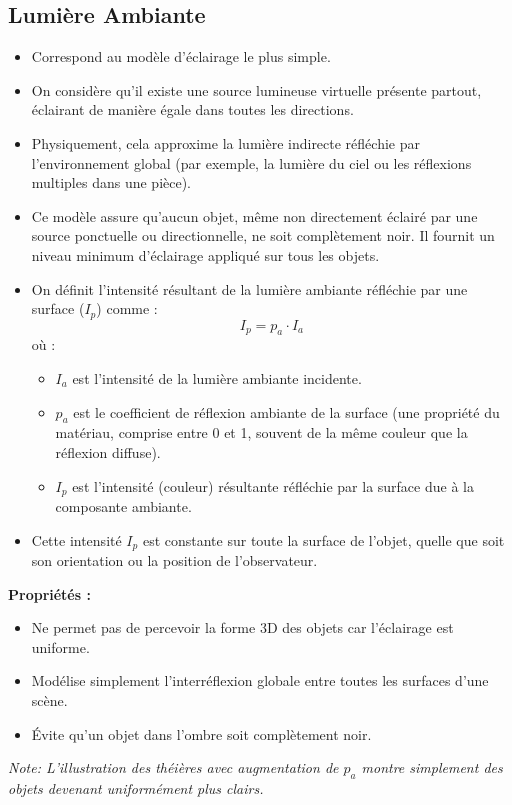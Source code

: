 \documentclass{article}
\begin{document}
\subsection{Lumière Ambiante}
\begin{itemize}
    \item Correspond au modèle d'éclairage le plus simple.
    \item On considère qu'il existe une source lumineuse virtuelle présente partout, éclairant de manière égale dans toutes les directions.
    \item Physiquement, cela approxime la lumière indirecte réfléchie par l'environnement global (par exemple, la lumière du ciel ou les réflexions multiples dans une pièce).
    \item Ce modèle assure qu'aucun objet, même non directement éclairé par une source ponctuelle ou directionnelle, ne soit complètement noir. Il fournit un niveau minimum d'éclairage appliqué sur tous les objets.
    \item On définit l'intensité résultant de la lumière ambiante réfléchie par une surface ($I_p$) comme :
      \[ I_p = p_a \cdot I_a \]
      où :
      \begin{itemize}
          \item $I_a$ est l'intensité de la lumière ambiante incidente.
          \item $p_a$ est le coefficient de réflexion ambiante de la surface (une propriété du matériau, comprise entre 0 et 1, souvent de la même couleur que la réflexion diffuse).
          \item $I_p$ est l'intensité (couleur) résultante réfléchie par la surface due à la composante ambiante.
      \end{itemize}
    \item Cette intensité $I_p$ est constante sur toute la surface de l'objet, quelle que soit son orientation ou la position de l'observateur.
\end{itemize}
\textbf{Propriétés :}
\begin{itemize}
    \item Ne permet pas de percevoir la forme 3D des objets car l'éclairage est uniforme.
    \item Modélise simplement l'interréflexion globale entre toutes les surfaces d'une scène.
    \item Évite qu'un objet dans l'ombre soit complètement noir.
\end{itemize}

\textit{Note: L'illustration des théières avec augmentation de $p_a$ montre simplement des objets devenant uniformément plus clairs.}
\end{document}
